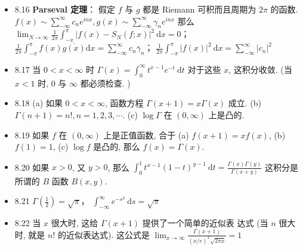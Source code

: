 \begin{itemize}
\item 8.16 \textbf{Parseval 定理}： 假定 $f$ 与 $g$ 都是 Riemann 可积而且周期为 $2 \pi$ 的函数. $f(x) \sim \sum_{-\infty}^{\infty} c_{n} e^{i n x}, g(x) \sim \sum_{-\infty}^{\infty} \gamma_{n} e^{i n x}$ 那么 $\lim _{N \rightarrow \infty} \frac{1}{2 \pi} \int_{-x}^{\pi}\left|f(x)-S_{N}(f ; x)\right|^{2} \mathrm{~d} x=0$； $\frac{1}{2 \pi} \int_{-\pi}^{\pi} f(x) \overline{g(x)} \mathrm{d} x=\sum_{-\infty}^{\infty} c_{n} \bar{\gamma}_{n}$； $\frac{1}{2 \pi} \int_{-\pi}^{\pi}|f(x)|^{2} \mathrm{~d} x=\sum_{-\infty}^{\infty}\left|c_{n}\right|^{2}$

\item 8.17 当 $0<x<\infty$ 时 $\Gamma(x)=\int_{0}^{\infty} t^{x-1} e^{-t} \mathrm{~d} t$ 对于这些 $x$, 这积分收敛. (当 $x<1$ 时, 0 与 $\infty$ 都必须检查. )

\item 8.18 (a) 如果 $0<x<\infty$, 函数方程 $\Gamma(x+1)=x \Gamma(x)$ 成立. (b) $\Gamma(n+1)=n !, n=1,2,3, \cdots$. (c) $\log \Gamma$ 在 $(0, \infty)$ 上是凸的.

\item 8.19 如果 $f$ 在 $(0, \infty)$ 上是正值函数, 合于 (a) $f(x+1)=x f(x)$, (b) $f(1)=1$, (c) $\log f$ 是凸的, 那么 $f(x)=\Gamma(x)$.

\item 8.20 如果 $x>0$, 又 $y>0$, 那么 $\int_{0}^{1} t^{x-1}(1-t)^{y-1} \mathrm{~d} t=\frac{\Gamma(x) \Gamma(y)}{\Gamma(x+y)}$ 这积分是所谓的 $B$ 函数 $B(x, y)$.

\item 8.21 $\Gamma\left(\frac{1}{2}\right)=\sqrt{\pi}$， $\int_{-\infty}^{\infty} e^{-s^{2}} \mathrm{~d} s=\sqrt{\pi}$

\item 8.22 当 $x$ 很大时, 这给 $\Gamma(x+1)$ 提供了一个简单的近似表 达式 (当 $n$ 很大时, 就是 $n !$ 的近似表达式). 这公式是 $\lim _{x \rightarrow \infty} \frac{\Gamma(x+1)}{(x / e)^{x} \sqrt{2 \pi x}}=1$
\end{itemize}
